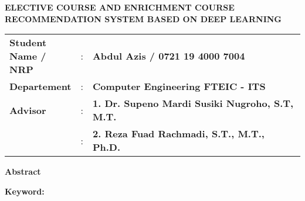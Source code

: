 {
\begin{center}
    \uppercase{\textbf{\large Elective Course and Enrichment course recommendation system based on Deep Learning}}
\end{center}

\vspace*{6 mm}
\begin{adjustwidth}{}{}
    \begin{tabular}{lcp{1\linewidth}}
        \noindent\textbf{Student Name / NRP} & : & \textbf{Abdul Azis / 0721 19 4000 7004}                \\
        \noindent\textbf{Departement}        & : & \textbf{Computer Engineering FTEIC - ITS}              \\
        \noindent\textbf{Advisor}            & : & \textbf{1. Dr. Supeno Mardi Susiki Nugroho, S.T, M.T.} \\
                                             & : & \textbf{2. Reza Fuad Rachmadi, S.T., M.T., Ph.D.}      \\
    \end{tabular}
\end{adjustwidth}

\vspace{6 mm}
\noindent
\textbf{Abstract}
\vspace{3 mm}


\vspace{6 mm}
\noindent
\textbf{Keyword: }
}



